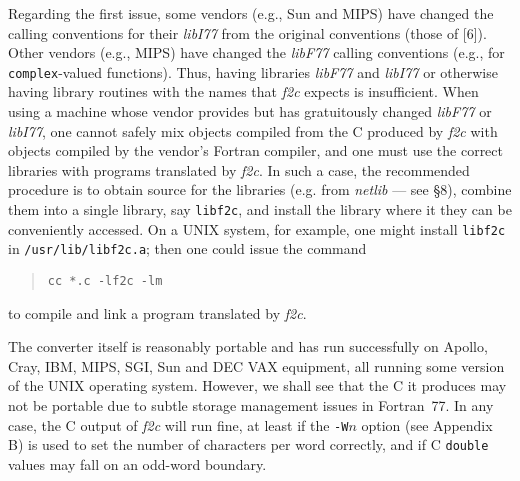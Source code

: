 \documentclass[12pt]{article}
\begin{document}
Regarding the first issue, some vendors (e.g., Sun and MIPS) have changed the calling conventions for their \emph{libI77} from the original conventions (those of [6]). Other vendors (e.g., MIPS) have changed the \emph{libF77} calling conventions (e.g., for \verb|complex|-valued functions). Thus, having libraries \emph{libF77} and \emph{libI77} or otherwise having library routines with the names that \emph{f2c} expects is insufficient. When using a machine whose vendor provides but has gratuitously changed \emph{libF77} or \emph{libI77}, one cannot safely mix objects compiled from the C produced by \emph{f2c} with objects compiled by the vendor’s Fortran compiler, and one must use the correct libraries with programs translated by \emph{f2c}. In such a case, the recommended procedure is to obtain source for the libraries (e.g. from \emph{netlib} --- see §8), combine them into a single library, say \verb|libf2c|, and install the library where it they can be conveniently accessed. On a UNIX system, for example, one might install \verb|libf2c| in \verb|/usr/lib/libf2c.a|; then one could issue the command
\begin{quote}
\begin{verbatim}
cc *.c -lf2c -lm
\end{verbatim}
\end{quote}
to compile and link a program translated by \emph{f2c}.

The converter itself is reasonably portable and has run successfully on Apollo, Cray, IBM, MIPS, SGI, Sun and DEC VAX equipment, all running some version of the UNIX operating system. However, we shall see that the C it produces may not be portable due to subtle storage management issues in Fortran~77. In any case, the C output of \emph{f2c} will run fine, at least if the \verb|-W|$n$ option (see Appendix B) is used to set the number of characters per word correctly, and if C \verb|double| values may fall on an odd-word boundary.
\end{document}
